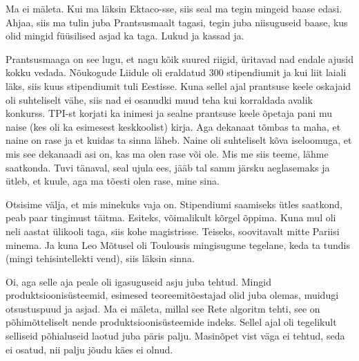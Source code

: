 
Ma ei mäleta. Kui ma läksin Ektaco-sse, siis seal ma tegin 
mingeid baase edasi. Ahjaa, siis ma tulin juba Prantsusmaalt tagasi, tegin juba 
niisuguseid baase, kus olid mingid füüsilised asjad ka taga. Lukud ja kassad ja.


Prantsusmaaga on see lugu, et nagu kõik suured riigid, üritavad nad endale 
ajusid 
kokku vedada. Nõukogude Liidule oli eraldatud 300 stipendiumit ja kui liit 
laiali läks, 
siis kuus stipendiumit tuli Eestisse. Kuna sellel ajal prantsuse keele  
oskajaid oli suhteliselt vähe, siis nad ei osanudki muud teha kui korraldada 
avalik konkurss. TPI-st korjati ka inimesi ja sealne prantsuse keele õpetaja 
pani mu naise (kes oli ka esimesest keskkoolist) kirja. Aga dekanaat tõmbas ta 
maha, et naine on rase ja et kuidas ta sinna läheb. Naine oli suhteliselt kõva 
iseloomuga, et mis see  dekanaadi asi on, kas ma olen rase või ole. Mis me siis 
teeme, lähme saatkonda. Tuvi tänaval, seal ujula ees, jääb tal samm järsku 
aeglasemaks ja ütleb, et kuule, aga ma tõesti olen rase, mine sina.

Otsisime välja, et mis minekuks vaja on. Stipendiumi saamiseks ütles saatkond, 
peab paar tingimust täitma. Esiteks, võimalikult kõrgel õppima. Kuna mul oli 
neli aastat ülikooli taga, siis kohe magistrisse. Teiseks, soovitavalt  mitte 
Pariisi minema. Ja kuna Leo Mõtusel oli Toulousis 
mingisugune tegelane, keda ta tundis (mingi tehisintellekti vend),  siis läksin 
sinna.
                

Oi, aga selle aja peale oli igasuguseid asju juba  tehtud. Mingid 
produktsioonisüsteemid,  esimesed teoreemitõestajad 
olid juba olemas, muidugi  otsustuspuud ja asjad. Ma ei mäleta, millal see 
Rete  algoritm tehti, see 
on põhimõtteliselt nende produktsioonisüsteemide indeks. Sellel ajal oli 
tegelikult selliseid põhialuseid laotud juba päris palju. Masinõpet vist väga 
ei tehtud, seda ei osatud, nii palju jõudu käes ei olnud.
                 
